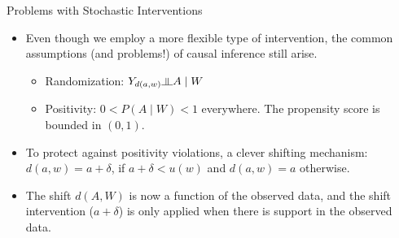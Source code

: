 \documentclass[12pt,t,handout]{beamer}
\newcommand{\indep}{\rotatebox[origin=c]{90}{$\models$}}
\begin{document}

\begin{frame}[c]{Problems with Stochastic Interventions}

\begin{center}
\begin{itemize}
  \itemsep10pt
  \item Even though we employ a more flexible type of intervention, the common
    assumptions (and problems!) of causal inference still arise.
    \begin{itemize}
      \item Randomization: $Y_{d(a,w)} \indep A \mid W$
      \item Positivity: $0 < P(A \mid W) < 1$ everywhere. The propensity score
        is bounded in $(0, 1)$.
    \end{itemize}
  \item To protect against positivity violations, a clever shifting mechanism:
    $d(a, w) = a + \delta$, if $a + \delta < u(w)$ and $d(a, w) = a$ otherwise.
  \item The shift $d(A, W)$ is now a function of the observed data, and the
    shift intervention ($a + \delta$) is only applied when there is support in
    the observed data.

\end{itemize}
\end{center}

\note{
}

\end{frame}


\end{document}
